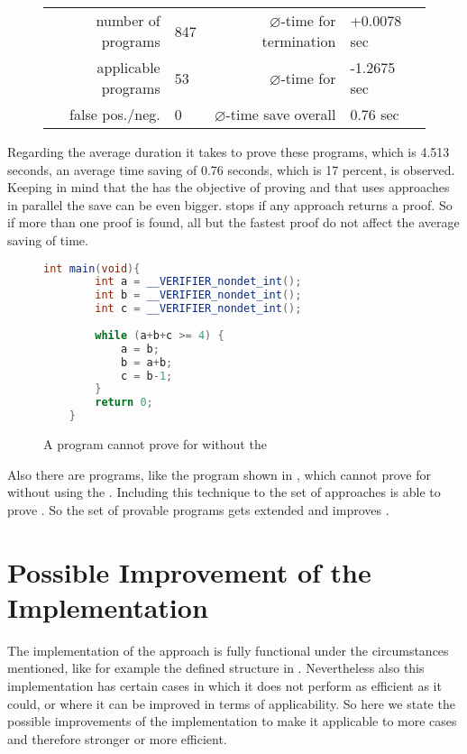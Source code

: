 \begin{figure}[H]
	\centering
	\begin{tabular}{rlrl}
		number of programs 	& 847 & $\varnothing$-time for termination & +0.0078 sec \\
		applicable programs & 53 & $\varnothing$-time for \nonterm & -1.2675 sec \\
		false pos./neg. & 0 & $\varnothing$-time save overall & 0.76 sec \\
	\end{tabular}	
\end{figure}

Regarding the average duration it takes \aprove to prove these programs, which is 4.513 seconds, an average time saving of 0.76 seconds, which is 17 percent, is observed. Keeping in mind that the \gnanal has the objective of proving \nonterm and that \aprove uses approaches in parallel the save can be even bigger. \aprove stops if any approach returns a proof. So if more than one proof is found, all but the fastest proof do not affect the average saving of time. \newline

\begin{figure}[H]
	\begin{lstlisting}[language = java]
	int main(void){
		int a = __VERIFIER_nondet_int();
		int b = __VERIFIER_nondet_int();
		int c = __VERIFIER_nondet_int();
		
		while (a+b+c >= 4) {
			a = b;
			b = a+b;
			c = b-1;
		}
		return 0;
	}
	\end{lstlisting}
	\caption{A program \aprove cannot prove \nonterm for without the \gnanal}
	\label{fig:program-newproof}
\end{figure}
Also there are programs, like the program shown in , which \aprove cannot prove \nonterm for without using the \gnanal. Including this technique to the set of approaches \aprove is able to prove \nonterm. So the set of provable programs gets extended and improves \aprove.


\section{Possible Improvement of the Implementation}
The implementation of the approach is fully functional under the circumstances mentioned, like for example the defined structure in . Nevertheless also this implementation has certain cases in which it does not perform as efficient as it could, or where it can be improved in terms of applicability.
So here we state the possible improvements of the implementation to make it applicable to more cases and therefore stronger or more efficient.
